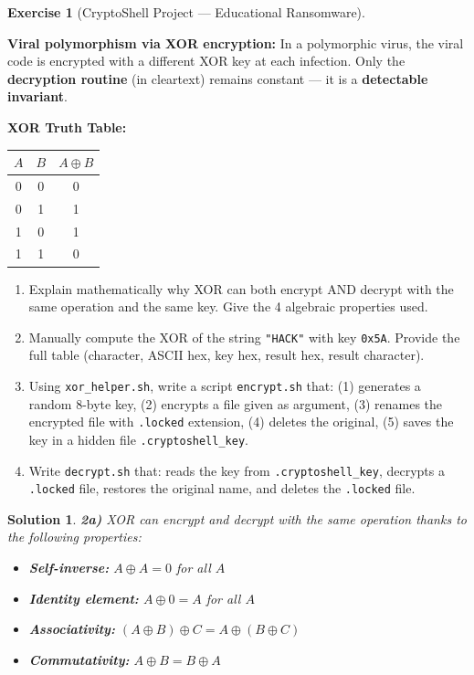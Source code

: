 \documentclass[a4paper,11pt]{article}
\theoremstyle{plain}
\newtheorem{correction}{Solution}
\theoremstyle{definition}
\newtheorem{exercice}{Exercise}
\begin{document}
\begin{exercice}[CryptoShell Project --- Educational Ransomware]
\begin{rappel}
\medskip
\textbf{Viral polymorphism via XOR encryption:} In a polymorphic virus, the viral code is encrypted with a different XOR key at each infection. Only the \textbf{decryption routine} (in cleartext) remains constant --- it is a \textbf{detectable invariant}.

\medskip
\textbf{XOR Truth Table:}
\begin{center}
\begin{tabular}{cc|c}
$A$ & $B$ & $A \oplus B$ \\
\midrule
0 & 0 & 0 \\
0 & 1 & 1 \\
1 & 0 & 1 \\
1 & 1 & 0 \\
\end{tabular}
\end{center}
\end{rappel}

\begin{enumerate}
\item[\textbf{2a)}] Explain mathematically why XOR can both encrypt AND decrypt with the same operation and the same key. Give the 4 algebraic properties used.

\item[\textbf{2b)}] Manually compute the XOR of the string \texttt{"HACK"} with key \texttt{0x5A}. Provide the full table (character, ASCII hex, key hex, result hex, result character).

\item[\textbf{2c)}] Using \texttt{xor\_helper.sh}, write a script \texttt{encrypt.sh} that: (1) generates a random 8-byte key, (2) encrypts a file given as argument, (3) renames the encrypted file with \texttt{.locked} extension, (4) deletes the original, (5) saves the key in a hidden file \texttt{.cryptoshell\_key}.

\item[\textbf{2d)}] Write \texttt{decrypt.sh} that: reads the key from \texttt{.cryptoshell\_key}, decrypts a \texttt{.locked} file, restores the original name, and deletes the \texttt{.locked} file.
\end{enumerate}

\begin{correction}

\textbf{2a)} XOR can encrypt and decrypt with the same operation thanks to the following properties:
\begin{itemize}
    \item \textbf{Self-inverse:} $A \oplus A = 0$ for all $A$
    \item \textbf{Identity element:} $A \oplus 0 = A$ for all $A$
    \item \textbf{Associativity:} $(A \oplus B) \oplus C = A \oplus (B \oplus C)$
    \item \textbf{Commutativity:} $A \oplus B = B \oplus A$
\end{itemize}


\end{correction}
\end{exercice}
\end{document}
